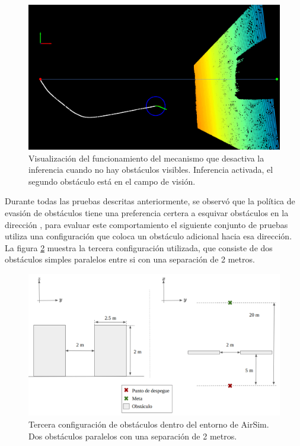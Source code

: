\begin{figure}[H]
    \centering
    \includegraphics[scale=0.225]{partes/ImgJoao/depth-dual-panel-3-second-obs.png}
    \caption[Visualización del funcionamiento del mecanismo que desactiva la inferencia cuando no hay obstáculos visibles. Inferencia activada, el segundo obstáculo está en el campo de visión.]{Visualización del funcionamiento del mecanismo que desactiva la inferencia cuando no hay obstáculos visibles. Inferencia activada, el segundo obstáculo está en el campo de visión.}
    \label{fig:depth-dual-panel-3}
\end{figure}

Durante todas las pruebas descritas anteriormente, se observó que la política de evasión de obstáculos tiene una preferencia certera a esquivar obstáculos en la dirección , para evaluar este comportamiento el siguiente conjunto de pruebas utiliza una configuración que coloca un obstáculo adicional hacia esa dirección. La figura \ref{fig:config-3-parallel} muestra la tercera configuración utilizada, que consiste de dos obstáculos simples paralelos entre si con una separación de 2 metros.

\begin{figure}[H]
    \centering
    \includegraphics[scale=0.35]{partes/ImgJoao/config-3-parallel.png}
    \caption[Tercera configuración de obstáculos dentro del entorno de AirSim.]{Tercera configuración de obstáculos dentro del entorno de AirSim. Dos obstáculos paralelos con una separación de 2 metros.}
    \label{fig:config-3-parallel}
\end{figure}

